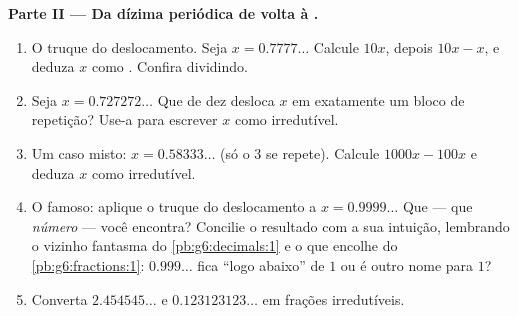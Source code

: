 \begin{problem}
\medskip
\noindent\textbf{Parte II --- Da dízima periódica de volta à .}
\begin{enumerate}[resume]
  \item O truque do deslocamento. Seja $x = 0.7777\ldots$ Calcule
        $10x$, depois $10x - x$, e deduza $x$ como . Confira
        dividindo.
  \item Seja $x = 0.727272\ldots$ Que  de dez desloca $x$ em
        exatamente um bloco de repetição? Use-a para escrever $x$ como
         irredutível.
  \item Um caso misto: $x = 0.58333\ldots$ (só o $3$ se repete).
        Calcule $1000x - 100x$ e deduza $x$ como  irredutível.
  \item O famoso: aplique o truque do deslocamento a
        $x = 0.9999\ldots$ Que  --- que \emph{número} --- você
        encontra? Concilie o resultado com a sua intuição, lembrando o
        vizinho fantasma do \cref{pb:g6:decimals:1} e o  que
        encolhe do \cref{pb:g6:fractions:1}: $0.999\ldots$ fica
        ``logo abaixo'' de $1$ ou é outro nome para $1$?
  \item Converta $2.454545\ldots$ e $0.123123123\ldots$ em frações
        irredutíveis.
\end{enumerate}


\end{problem}
